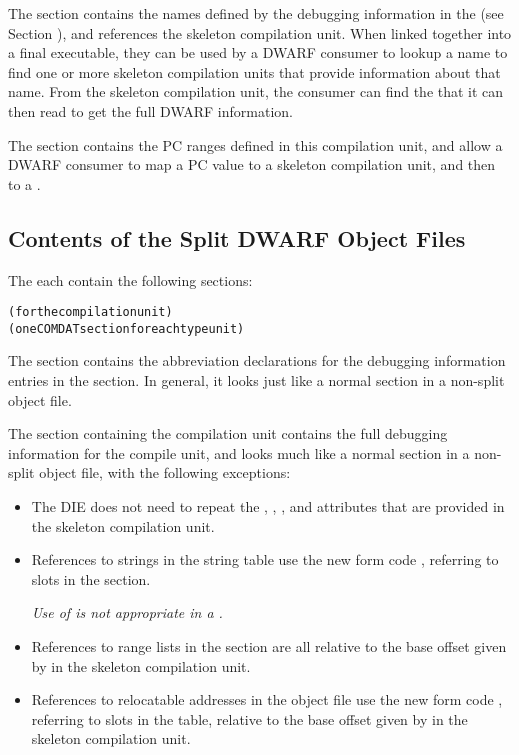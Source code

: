 The \dotdebugnames{}
section contains the names defined by the debugging
information in the \splitDWARFobjectfile{} 
(see Section ), 
and references the skeleton compilation unit. 
When linked together into a final executable,
they can be used by a DWARF consumer to lookup a name to find one
or more skeleton compilation units that provide information about
that name. From the skeleton compilation unit, the consumer can
find the \splitDWARFobjectfile{} that it can then read to get the full
DWARF information.

The \dotdebugaranges{} section contains the PC ranges defined in this
compilation unit, and allow a DWARF consumer to map a PC value to
a skeleton compilation unit, and then to a \splitDWARFobjectfile.


\subsection{Contents of the Split DWARF Object Files}
The  each contain the following sections:
\begin{alltt}
  \dotdebugabbrevdwo
  \dotdebuginfodwo{} (for the compilation unit)
  \dotdebuginfodwo{} (one COMDAT section for each type unit)
  \dotdebuglocdwo
  \dotdebuglinedwo
  \dotdebugmacrodwo
  \dotdebugstroffsetsdwo
  \dotdebugstrdwo
\end{alltt}
The \dotdebugabbrevdwo{} section contains the abbreviation
declarations for the debugging information entries in the
\dotdebuginfodwo{} section. In general, it looks just like a normal
\dotdebugabbrev{} section in a non-split object file.

The \dotdebuginfodwo{} section containing the compilation unit
contains the full debugging information for the compile unit, and
looks much like a normal \dotdebuginfo{} section in a non-split
object file, with the following exceptions:
\begin{itemize}
\item The \DWTAGcompileunit{} DIE does not need to repeat the
\DWATranges, \DWATlowpc, \DWAThighpc, and
\DWATstmtlist{} attributes that are provided in the skeleton
compilation unit.

\item References to strings in the string table use the new form
code \DWFORMstrx, referring to slots in the
\dotdebugstroffsetsdwo{} section.

\textit{Use of \DWFORMstrp{} is not appropriate in a \splitDWARFobjectfile.}

\item References to range lists in the \dotdebugranges{} section are
all relative to the base offset given by \DWATrangesbase{}
in the skeleton compilation unit.

\item References to relocatable addresses in the object file use
the new form code \DWFORMaddrx, referring to slots in the
\dotdebugaddr{} table, relative to the base offset given by
\DWATaddrbase{} in the skeleton compilation unit.
\end{itemize}

